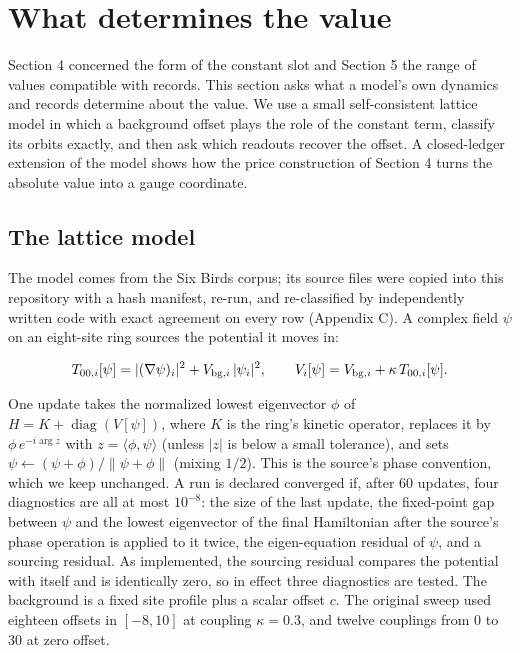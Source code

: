 \hypertarget{what-determines-the-value}{%
\section{What determines the value}\label{what-determines-the-value}}

Section 4 concerned the form of the constant slot and Section 5 the
range of values compatible with records. This section asks what a
model's own dynamics and records determine about the value. We use a
small self-consistent lattice model in which a background offset plays
the role of the constant term, classify its orbits exactly, and then ask
which readouts recover the offset. A closed-ledger extension of the
model shows how the price construction of Section 4 turns the absolute
value into a gauge coordinate.

\hypertarget{the-lattice-model}{%
\subsection{The lattice model}\label{the-lattice-model}}

The model comes from the Six Birds corpus; its source files were copied
into this repository with a hash manifest, re-run, and re-classified by
independently written code with exact agreement on every row (Appendix
C). A complex field \(\psi\) on an eight-site ring sources the potential
it moves in:

\[T_{00,i}[\psi]=|(\nabla\psi)_i|^2+V_{{\rm bg},i}\,|\psi_i|^2,\qquad V_i[\psi]=V_{{\rm bg},i}+\kappa\,T_{00,i}[\psi].\]

One update takes the normalized lowest eigenvector \(\phi\) of
\(H=K+\operatorname{diag}(V[\psi])\), where \(K\) is the ring's kinetic
operator, replaces it by \(\phi\,e^{-i\arg z}\) with
\(z=\langle\phi,\psi\rangle\) (unless \(|z|\) is below a small
tolerance), and sets \(\psi\leftarrow(\psi+\phi)/\|\psi+\phi\|\) (mixing
\(1/2\)). This is the source's phase convention, which we keep
unchanged. A run is declared converged if, after 60 updates, four
diagnostics are all at most \(10^{-8}\): the size of the last update,
the fixed-point gap between \(\psi\) and the lowest eigenvector of the
final Hamiltonian after the source's phase operation is applied to it
twice, the eigen-equation residual of \(\psi\), and a sourcing residual.
As implemented, the sourcing residual compares the potential with itself
and is identically zero, so in effect three diagnostics are tested. The
background is a fixed site profile plus a scalar offset \(c\). The
original sweep used eighteen offsets in \([-8,10]\) at coupling
\(\kappa=0.3\), and twelve couplings from \(0\) to \(30\) at zero
offset.

